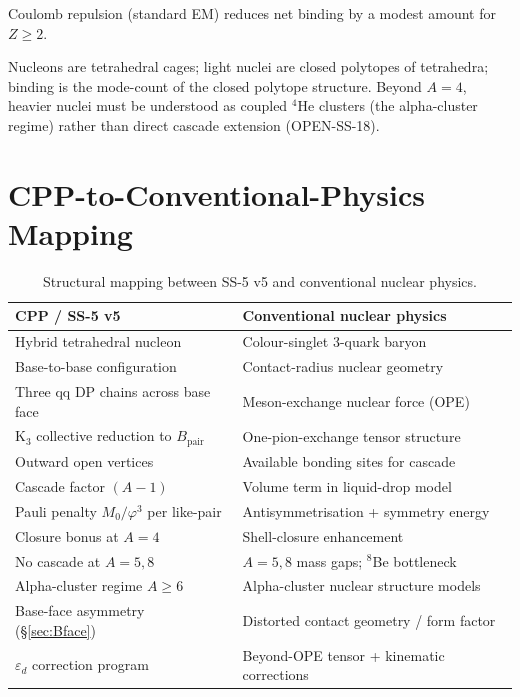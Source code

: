 \documentclass[11pt,letterpaper]{article}
\newcommand{\phig}{\varphi}
\newcommand{\Mzero}{M_0}
\newcommand{\Bpair}{B_{\mathrm{pair}}}
\newcommand{\epsd}{\varepsilon_{d}}
\begin{document}
Coulomb repulsion (standard EM) reduces net binding by a modest amount for $Z \geq 2$.

Nucleons are tetrahedral cages; light nuclei are closed polytopes of tetrahedra; binding is the mode-count of the closed polytope structure. Beyond $A = 4$, heavier nuclei must be understood as coupled ${}^4$He clusters (the alpha-cluster regime) rather than direct cascade extension (OPEN-SS-18).

\section{CPP-to-Conventional-Physics Mapping}
\label{sec:mapping}

\begin{table}[H]
\centering
\caption{Structural mapping between SS-5 v5 and conventional nuclear physics.}
\label{tab:mapping}
\begin{tabular}{@{}p{} p{}@{}}
\toprule
\textbf{CPP / SS-5 v5} & \textbf{Conventional nuclear physics} \\
\midrule
Hybrid tetrahedral nucleon & Colour-singlet 3-quark baryon \\[3pt]
Base-to-base configuration & Contact-radius nuclear geometry \\[3pt]
Three qq DP chains across base face & Meson-exchange nuclear force (OPE) \\[3pt]
K$_3$ collective reduction to $\Bpair$ & One-pion-exchange tensor structure \\[3pt]
Outward open vertices & Available bonding sites for cascade \\[3pt]
Cascade factor $(A-1)$ & Volume term in liquid-drop model \\[3pt]
Pauli penalty $\Mzero/\phig^3$ per like-pair & Antisymmetrisation + symmetry energy \\[3pt]
Closure bonus at $A=4$ & Shell-closure enhancement \\[3pt]
No cascade at $A=5, 8$ & $A=5, 8$ mass gaps; ${}^8$Be bottleneck \\[3pt]
Alpha-cluster regime $A \geq 6$ & Alpha-cluster nuclear structure models \\[3pt]
Base-face asymmetry (§\ref{sec:Bface}) & Distorted contact geometry / form factor \\[3pt]
$\epsd$ correction program & Beyond-OPE tensor + kinematic corrections \\
\bottomrule
\end{tabular}
\end{table}
\end{document}
